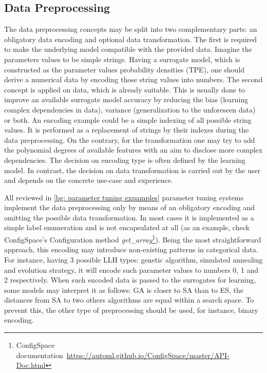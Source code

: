 \subsection{Data Preprocessing}\label{impl: preprocessing}
The data preprocessing concepts may be split into two complementary parts: an obligatory data encoding and optional data transformation. The first is required to make the underlying model compatible with the provided data. Imagine the parameters values to be simple strings. Having a surrogate model, which is constructed as the parameter values probability densities (TPE), one should derive a numerical data by encoding those string values into numbers. The second concept is applied on data, which is already suitable. This is usually done to improve an available surrogate model accuracy by reducing the bias (learning complex dependencies in data), variance (generalization to the unforeseen data) or both. An encoding example could be a simple indexing of all possible string values. It is performed as a replacement of strings by their indexes during the data preprocessing. On the contrary, for the transformation one may try to add the polynomial degrees of available features with an aim to disclose more complex dependencies. The decision on encoding type is often defined by the learning model. In contrast, the decision on data transformation is carried out by the user and depends on the concrete use-case and experience.

All reviewed in \cref{bg: parameter tuning expamples} parameter tuning systems implement the data preprocessing only by means of an obligatory encoding and omitting the possible data transformation. In most cases it is implemented as a simple label enumeration and is not encapsulated at all (as an example, check ConfigSpace's Configuration method \emph{get\_array}\footnote{ConfigSpace documentation~\url{https://automl.github.io/ConfigSpace/master/API-Doc.html}}). Being the most straightforward approach, this encoding may introduce non-existing patterns in categorical data. For instance, having 3 possible LLH types: genetic algorithm, simulated annealing and evolution strategy, it will encode such parameter values to numbers 0, 1 and 2 respectively. When such encoded data is passed to the surrogates for learning, some models may interpret it as follows: GA is closer to SA than to ES, the distances from SA to two others algorithms are equal within a search space. To prevent this, the other type of preprocessing should be used, for instance, binary encoding.

